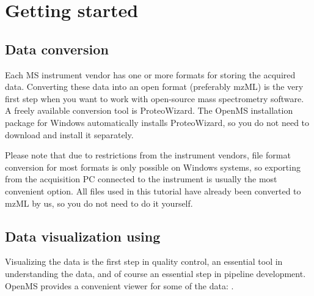 
\setcounter{equation}{0}

\section{Getting started}

\subsection{Data conversion}
\label{Data_Conversion}

Each MS instrument vendor has one or more formats for storing the acquired data. Converting these data into an open format (preferably mzML) is the very first step when you want to work with open-source mass spectrometry software. A freely available conversion tool is ProteoWizard. The OpenMS installation package for Windows automatically installs ProteoWizard, so you do not need to download and install it separately.

Please note that due to restrictions from the instrument vendors, file format conversion for most formats is only possible on Windows systems, so exporting from the acquisition PC connected to the instrument is usually the most convenient option.
All files used in this tutorial have already been converted to mzML by us, so you do not need to do it yourself.


\subsection{Data visualization using }
\label{Data_Visualization}

Visualizing the data is the first step in quality control, an essential tool in understanding the data, and of course an essential step in pipeline development.
OpenMS provides a convenient viewer for some of the data: .

